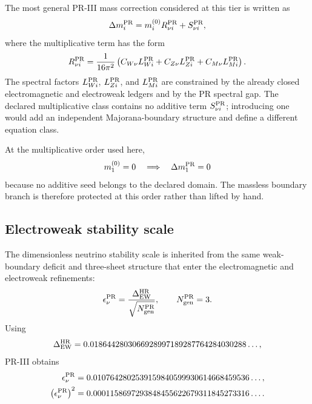 \documentclass[11pt]{article}
\begin{document}
The most general PR-III mass correction considered at this tier is written as
\begin{equation}
\Delta m_i^{\rm PR}
=
m_i^{(0)}R_{\nu i}^{\rm PR}
+
S_{\nu i}^{\rm PR},
\label{eq:priii-neutrino-general-correction}
\end{equation}
where the multiplicative term has the form
\begin{equation}
R_{\nu i}^{\rm PR}
=
\frac{1}{16\pi^2}
\left(
C_{W\nu}L_{W i}^{\rm PR}
+
C_{Z\nu}L_{Z i}^{\rm PR}
+
C_{M\nu}L_{M i}^{\rm PR}
\right).
\label{eq:priii-neutrino-multiplicative-kernel}
\end{equation}
The spectral factors \(L_{W i}^{\rm PR}\), \(L_{Z i}^{\rm PR}\), and \(L_{M i}^{\rm PR}\) are constrained by the already closed electromagnetic and electroweak ledgers and by the PR spectral gap.  The declared multiplicative class contains no additive term \(S_{\nu i}^{\rm PR}\); introducing one would add an independent Majorana-boundary structure and define a different equation class.

At the multiplicative order used here,
\begin{equation}
m_1^{(0)}=0
\quad\Longrightarrow\quad
\Delta m_1^{\rm PR}=0
\end{equation}
because no additive seed belongs to the declared domain.  The massless boundary branch is therefore protected at this order rather than lifted by hand.

\subsection{Electroweak stability scale}
\label{subsec:priii-neutrino-ew-stability-scale}

The dimensionless neutrino stability scale is inherited from the same weak-boundary deficit and three-sheet structure that enter the electromagnetic and electroweak refinements:
\begin{equation}
\epsilon_\nu^{\rm PR}
=
\frac{\Delta_{\rm EW}^{\rm HR}}
{\sqrt{N_{\rm gen}^{\rm PR}}},
\qquad
N_{\rm gen}^{\rm PR}=3.
\label{eq:priii-epsilon-nu}
\end{equation}
Using
\begin{equation}
\Delta_{\rm EW}^{\rm HR}
=
0.0186442803066928997189287764284030288\ldots,
\end{equation}
PR-III obtains
\begin{align}
\epsilon_\nu^{\rm PR}
&=
0.0107642802539159840599930614668459536\ldots,
\\
\left(\epsilon_\nu^{\rm PR}\right)^2
&=
0.0001158697293848455622679311845273316\ldots .
\end{align}
\end{document}
